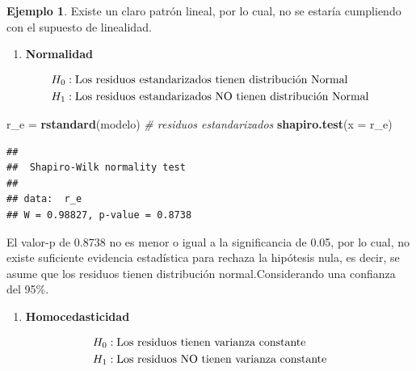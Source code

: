 \documentclass[
  11pt,
]{book}
\newenvironment{Shaded}{\begin{snugshade}}{\end{snugshade}}
\newcommand{\AttributeTok}[1]{\textcolor[rgb]{0.13,0.29,0.53}{#1}}
\newcommand{\CommentTok}[1]{\textcolor[rgb]{0.56,0.35,0.01}{\textit{#1}}}
\newcommand{\FunctionTok}[1]{\textcolor[rgb]{0.13,0.29,0.53}{\textbf{#1}}}
\newcommand{\NormalTok}[1]{#1}
\newcommand{\OtherTok}[1]{\textcolor[rgb]{0.56,0.35,0.01}{#1}}
\providecommand{\tightlist}{%
  \setlength{\itemsep}{0pt}\setlength{\parskip}{0pt}}
\theoremstyle{definition}
\theoremstyle{definition}
\newtheorem{example}{Ejemplo}[chapter]
\theoremstyle{definition}
\theoremstyle{definition}
\theoremstyle{remark}
\begin{document}
\begin{example}
Existe un claro patrón lineal, por lo cual, no se estaría cumpliendo con el supuesto de linealidad.

\begin{enumerate}
\def\labelenumi{\arabic{enumi}.}
\setcounter{enumi}{1}
\tightlist
\item
  \textbf{Normalidad}
\end{enumerate}

\begin{equation}
\notag
\begin{split}
H_0&: \text{Los residuos estandarizados tienen distribución Normal}\\
H_1&: \text{Los residuos estandarizados NO tienen distribución Normal}\\
\end{split}
\end{equation}

\begin{Shaded}
\begin{Highlighting}[]
\NormalTok{r\_e }\OtherTok{=} \FunctionTok{rstandard}\NormalTok{(modelo) }\CommentTok{\# residuos estandarizados}
\FunctionTok{shapiro.test}\NormalTok{(}\AttributeTok{x =}\NormalTok{ r\_e)}
\end{Highlighting}
\end{Shaded}

\begin{verbatim}
## 
##  Shapiro-Wilk normality test
## 
## data:  r_e
## W = 0.98827, p-value = 0.8738
\end{verbatim}

El valor-p de 0.8738 no es menor o igual a la significancia de 0.05, por lo cual, no existe suficiente evidencia estadística para rechaza la hipótesis nula, es decir, se asume que los residuos tienen distribución normal.Considerando una confianza del 95\%.

\begin{enumerate}
\def\labelenumi{\arabic{enumi}.}
\setcounter{enumi}{2}
\tightlist
\item
  \textbf{Homocedasticidad}
\end{enumerate}

\begin{equation}
\notag
\begin{split}
H_0&: \text{Los residuos tienen varianza constante}\\
H_1&: \text{Los residuos NO tienen varianza constante}\\
\end{split}
\end{equation}


\end{example}
\end{document}
